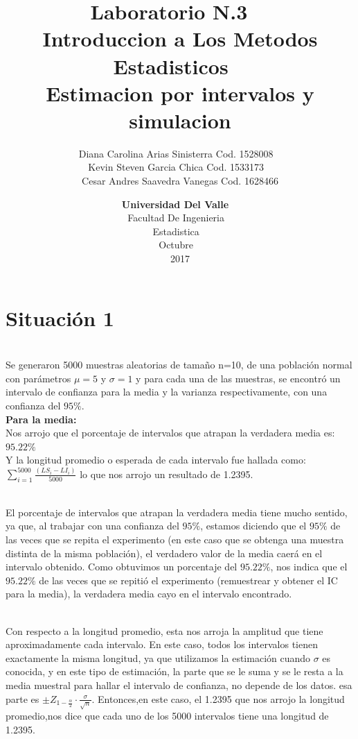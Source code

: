 \documentclass[letterpaper,12pt,onecolumn,titlepage]{article}
\title{
    \textbf{Laboratorio N.3}\
    ~\\{Introduccion a Los Metodos Estadisticos}   
    ~\\{Estimacion por intervalos y simulacion}}
\author{
    {Diana Carolina Arias Sinisterra Cod. 1528008}
 ~\\{Kevin Steven Garcia Chica Cod. 1533173}
 ~\\{Cesar Andres Saavedra Vanegas Cod. 1628466}}
\date{
     \textbf{Universidad Del Valle}\   
    ~\\{Facultad De Ingenieria}
    ~\\{Estadistica}
    ~\\{Octubre}
    ~\\{2017}}
\begin{document}
 
\renewcommand{\listtablename}{}
\renewcommand{\tablename}{Tabla}
\maketitle
\setcounter{page}{2}
\tableofcontents{}

\thispagestyle{empty}

\newpage
\fancyhead{}
\fancyfoot{}
 
\lfoot{Universidad Del Valle}
\rfoot{\thepage}


 
\pagebreak\section{Situaci\'{o}n 1}
~\\ Se generaron 5000 muestras aleatorias de tama\~{n}o n=10, de una poblaci\'{o}n normal con par\'{a}metros $\mu=5$ y $\sigma=1$ y para cada una de las muestras, se encontr\'{o} un intervalo de confianza para la media y la varianza respectivamente, con una confianza del $95\%$.
~\\ \textbf{Para la media:}
~\\Nos arrojo que el porcentaje de intervalos que atrapan la verdadera media es: $95.22\%$
~\\ Y la longitud promedio o esperada de cada intervalo fue hallada como: $\sum\limits_{i=1}^{5000}\frac{(LS_{i}-LI_{i})}{5000}$ lo que nos arrojo un resultado de 1.2395.

~\\El porcentaje de intervalos que atrapan la verdadera media tiene mucho sentido, ya que, al trabajar con una confianza del $95\%$, estamos diciendo que el $95\%$ de las veces que se repita el experimento (en este caso que se obtenga una muestra distinta de la misma poblaci\'{o}n), el verdadero valor de la media caer\'{a} en el intervalo obtenido. Como obtuvimos un porcentaje del $95.22\%$, nos indica que el $95.22\%$ de las veces que se repiti\'{o} el experimento (remuestrear y obtener el IC para la media), la verdadera media cayo en el intervalo encontrado.

~\\ Con respecto a la longitud promedio, esta nos arroja la amplitud que tiene aproximadamente cada intervalo. En este caso, todos los intervalos tienen exactamente la misma longitud, ya que utilizamos la estimaci\'{o}n cuando $\sigma$ es conocida, y en este tipo de estimaci\'{o}n, la parte que se le suma y se le resta a la media muestral para hallar el intervalo de confianza, no depende de los datos. esa parte es $\pm Z_{1-\frac{\alpha}{2}}\cdot\frac{\sigma}{\sqrt{n}}$. Entonces,en este caso, el 1.2395 que nos arrojo la longitud promedio,nos dice que cada uno de los 5000 intervalos tiene una longitud de 1.2395.
\end{document}
